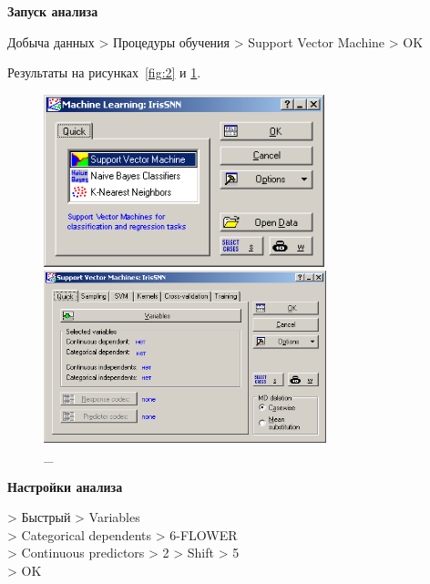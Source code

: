 \newpage

\begin{center}
  \textbf{Запуск анализа}
\end{center}

Добыча данных > Процедуры обучения > Support Vector Machine > OK

Результаты на рисунках~\ref{fig:2} и \ref{fig:3}.

\begin{figure}[!h]
  \centering

  \begin{minipage}{0.49\textwidth}
    \centering

    \includegraphics[height=5cm]
    {inc/ex_2.PNG}

    \caption{\_}

    \label{fig:2}
  \end{minipage}
  \begin{minipage}{0.49\textwidth}
    \centering

    \includegraphics[height=5cm]
    {inc/ex_3.PNG}

    \caption{\_}

    \label{fig:3}
  \end{minipage}
\end{figure}

\begin{center}
  \textbf{Настройки анализа}
\end{center}

> Быстрый > Variables \\
> Categorical dependents > 6-FLOWER \\
> Continuous predictors > 2 > Shift > 5 \\
> OK

